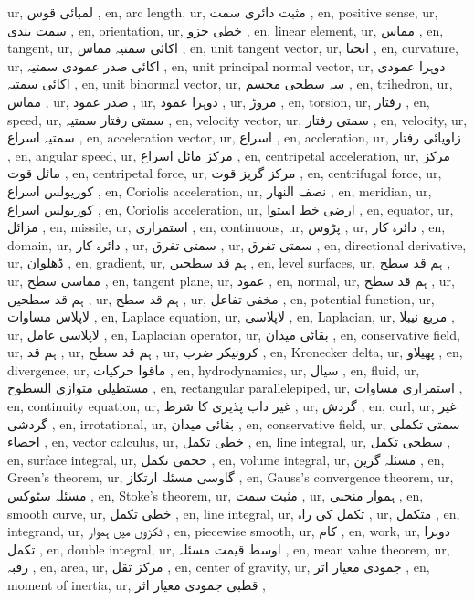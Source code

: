 ur, لمبائی قوس ,
en, arc length,
ur, مثبت دائری سمت ,
en, positive sense,
ur, سمت بندی ,
en, orientation,
ur, خطی جزو ,
en, linear element,
ur, مماس ,
en, tangent,
ur, اکائی سمتیہ مماس ,
en, unit tangent vector,
ur, انحنا ,
en, curvature,
ur, اکائی صدر عمودی سمتیہ ,
en, unit principal normal vector,
ur, دوہرا عمودی اکائی سمتیہ ,
en, unit binormal vector,
ur, سہ سطحی مجسم ,
en, trihedron,
ur, مماس ,
ur, صدر عمود ,
ur, دوہرا عمود ,
ur, مروڑ ,
en, torsion,
ur, رفتار ,
en, speed,
ur, سمتی رفتار سمتیہ ,
en, velocity vector,
ur, سمتی رفتار ,
en, velocity,
ur, سمتیہ اسراع ,
en, acceleration vector,
ur, اسراع ,
en, accleration,
ur, زاویائی رفتار ,
en, angular speed,
ur, مرکز مائل اسراع ,
en, centripetal acceleration,
ur, مرکز مائل قوت ,
en, centripetal force,
ur, مرکز گریز قوت ,
en, centrifugal force,
ur, کوریولس اسراع ,
en, Coriolis acceleration,
ur, نصف النھار ,
en, meridian,
ur, کوریولس اسراع ,
en, Coriolis acceleration,
ur, ارضی خط استوا ,
en, equator,
ur, مزائل ,
en, missile,
ur, استمراری ,
en, continuous,
ur, پڑوس ,
ur, دائرہ کار ,
en, domain,
ur, دائرہ کار ,
ur, سمتی تفرق ,
ur, سمتی تفرق ,
en, directional derivative,
ur, ڈھلوان ,
en, gradient,
ur, ہم قد سطحیں ,
en, level surfaces,
ur, ہم قد سطح ,
ur, مماسی سطح ,
en, tangent plane,
ur, عمود ,
en, normal,
ur, ہم قد سطح ,
ur, ہم قد سطحیں ,
ur, ہم قد سطح ,
ur, مخفی تفاعل ,
en, potential function,
ur, لاپلاس مساوات ,
en, Laplace equation,
ur, لاپلاسی ,
en, Laplacian,
ur, مربع نیبلا ,
ur, لاپلاسی عامل ,
en, Laplacian operator,
ur, بقائی میدان ,
en, conservative field,
ur, ہم قد ,
ur, ہم قد سطح ,
ur, کرونیکر ضرب ,
en, Kronecker delta,
ur, پھیلاو ,
en, divergence,
ur, ماقوا حرکیات ,
en, hydrodynamics,
ur, سیال ,
en, fluid,
ur, مستطیلی متوازی السطوح ,
en, rectangular parallelepiped,
ur, استمراری مساوات ,
en, continuity equation,
ur, غیر داب پذیری کا شرط ,
ur, گردش ,
en, curl,
ur, غیر گردشی ,
en, irrotational,
ur, بقائی میدان ,
en, conservative field,
ur, سمتی تکملی احصاء ,
en, vector calculus,
ur, خطی تکمل ,
en, line integral,
ur, سطحی تکمل ,
en, surface integral,
ur, حجمی تکمل ,
en, volume integral,
ur, مسئلہ گرین ,
en, Green's theorem,
ur, گاوسی مسئلہ ارتکاز ,
en, Gauss's convergence theorem,
ur, مسئلہ سٹوکس ,
en, Stoke's theorem,
ur, مثبت سمت ,
ur, ہموار منحنی ,
en, smooth curve,
ur, خطی تکمل ,
en, line integral,
ur, تکمل کی راہ ,
ur, متکمل ,
en, integrand,
ur, ٹکڑوں میں ہموار ,
en, piecewise smooth,
ur, کام ,
en, work,
ur, دوہرا تکمل ,
en, double integral,
ur, اوسط قیمت مسئلہ ,
en, mean value theorem,
ur, رقبہ ,
en, area,
ur, مرکز ثقل ,
en, center of gravity,
ur, جمودی معیار اثر ,
en, moment of inertia,
ur, قطبی جمودی معیار اثر ,
